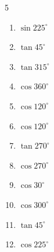 \begin{multicols}{5}
\begin{enumerate}

  \item $\displaystyle \sin{225^\circ}$


  \item $\displaystyle \tan{45^\circ}$

        \phantom{$\displaystyle =1$}

  \item $\displaystyle \tan{315^\circ}$

        \phantom{$\displaystyle =-1$}

  \item $\displaystyle \cos{360^\circ}$

        \phantom{$\displaystyle =1$}

  \item $\displaystyle \cos{120^\circ}$


  \item $\displaystyle \cos{120^\circ}$


  \item $\displaystyle \tan{270^\circ}$

        \phantom{$\displaystyle なし$}

  \item $\displaystyle \cos{270^\circ}$

        \phantom{$\displaystyle =0$}

  \item $\displaystyle \cos{30^\circ}$


  \item $\displaystyle \cos{300^\circ}$


  \item $\displaystyle \tan{45^\circ}$

        \phantom{$\displaystyle =1$}

\columnbreak %

  \item $\displaystyle \cos{225^\circ}$



\end{enumerate}
\end{multicols}
